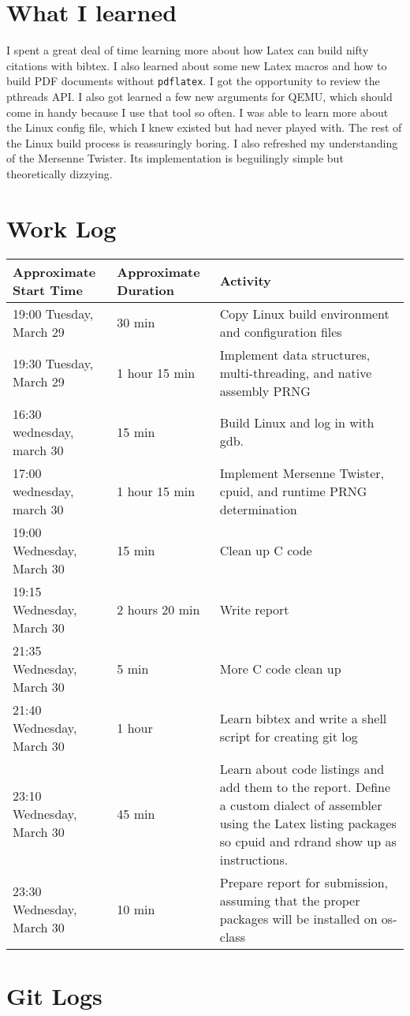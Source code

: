 \documentclass[10pt,conference,draftclsnofoot,onecolumn]{IEEEtran}
\begin{document}
\section{What I learned}
I spent a great deal of time learning more about how Latex can build nifty citations with bibtex. I also learned about some new Latex macros and how to build PDF documents without \texttt{pdflatex}. I got the opportunity to review the pthreads API. I also got learned a few new arguments for QEMU, which should come in handy because I use that tool so often. I was able to learn more about the Linux config file, which I knew existed but had never played with. The rest of the Linux build process is reassuringly boring. I also refreshed my understanding of the Mersenne Twister. Its implementation is beguilingly simple but theoretically dizzying.


\section{Work Log}
\begin{tabular}{|p{5cm}|p{5cm}|p{5cm}}
    \textbf{Approximate Start Time} & \textbf{Approximate Duration} & \textbf{Activity} \\
    \hline
    19:00 Tuesday, March 29 & 30 min & Copy Linux build environment and configuration files \\
    19:30 Tuesday, March 29 & 1 hour 15 min & Implement data structures, multi-threading, and native assembly PRNG \\
    16:30 wednesday, march 30 & 15 min & Build Linux and log in with gdb. \\
    17:00 wednesday, march 30 & 1 hour 15 min & Implement Mersenne Twister, cpuid, and runtime PRNG determination \\
    19:00 Wednesday, March 30 & 15 min & Clean up C code \\
    19:15 Wednesday, March 30 & 2 hours 20 min & Write report \\
    21:35 Wednesday, March 30 & 5 min & More C code clean up \\
    21:40 Wednesday, March 30 & 1 hour & Learn bibtex and write a shell script for creating git log \\
    23:10 Wednesday, March 30 & 45 min & Learn about code listings and add them to the report. Define a custom dialect of assembler using the Latex listing packages so cpuid and rdrand show up as instructions. \\
    23:30 Wednesday, March 30 & 10 min & Prepare report for submission, assuming that the proper packages will be installed on os-class \\
\end{tabular}

\bigskip
\bigskip

\section{Git Logs}



\clearpage
\printbibliography
\end{document}
